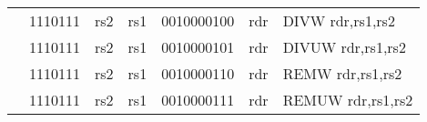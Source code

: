 \begin{table}[p]
\begin{small}
\begin{center}
\begin{tabular}{rcccccccccccl}
&
\multicolumn{2}{|c|}{1110111} &
\multicolumn{1}{c|}{rs2} &
\multicolumn{1}{c|}{rs1} &
\multicolumn{6}{c|}{0010000100} &
\multicolumn{1}{c|}{rdr} & DIVW rdr,rs1,rs2 \\
\cline{2-12}
  

&
\multicolumn{2}{|c|}{1110111} &
\multicolumn{1}{c|}{rs2} &
\multicolumn{1}{c|}{rs1} &
\multicolumn{6}{c|}{0010000101} &
\multicolumn{1}{c|}{rdr} & DIVUW rdr,rs1,rs2 \\
\cline{2-12}
  

&
\multicolumn{2}{|c|}{1110111} &
\multicolumn{1}{c|}{rs2} &
\multicolumn{1}{c|}{rs1} &
\multicolumn{6}{c|}{0010000110} &
\multicolumn{1}{c|}{rdr} & REMW rdr,rs1,rs2 \\
\cline{2-12}
  

&
\multicolumn{2}{|c|}{1110111} &
\multicolumn{1}{c|}{rs2} &
\multicolumn{1}{c|}{rs1} &
\multicolumn{6}{c|}{0010000111} &
\multicolumn{1}{c|}{rdr} & REMUW rdr,rs1,rs2 \\
\cline{2-12}
  

\end{tabular}
\end{center}
\end{small}

\label{instr-table}
\end{table}
  

\newpage

